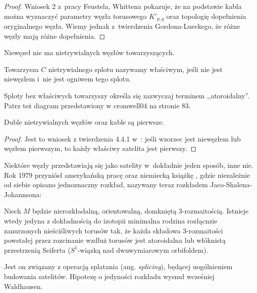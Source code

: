 \begin{proof}
    Wniosek 2 z~pracy \cite{feustel78} Feustela, Whittena pokazuje, że na podstawie kabla można wyznaczyć parametry węzła torusowego $K'_{p,q}$ oraz topologię dopełnienia oryginalnego węzła.
    Wiemy jednak z~twierdzenia Gordona-Lueckego, że różne węzły mają różne dopełnienia.
\end{proof}

Niewęzeł nie ma nietrywialnych węzłów towarzyszących.

\begin{definition}
	Towarzysza $C$ nietrywialnego splotu nazywamy właściwym, jeśli nie jest niewęzłem i~nie jest ogniwem tego splotu.
\end{definition}

Sploty bez właściwych towarzyszy określa się zazwyczaj terminem ,,atoroidalny''.
Patrz też diagram przedstawiony w {cromwell04} na stronie 83.

\begin{proposition}
	Duble nietrywialnych węzłów oraz kable są pierwsze.
\end{proposition}

\begin{proof}
	Jest to wniosek z twierdzenia 4.4.1 w~\cite{cromwell04}: jeśli wzorzec jest niewęzłem lub węzłem pierwszym, to każdy właściwy satelita jest pierwszy.
\end{proof}

Niektóre węzły przedstawiają się jako satelity w~dokładnie jeden sposób, inne nie.
Rok 1979 przyniósł amerykańską pracę \cite{jaco79} oraz niemiecką książkę \cite{johannson79}, gdzie niezależnie od siebie opisano jednoznaczny rozkład, nazywany teraz rozkładem Jaco-Shalena-Johannsona:

\begin{proposition}
	Niech $M$ będzie nierozkładalną, orientowalną, domkniętą 3-rozmaitością.
	Istnieje wtedy jedyna z dokładnością do izotopii minimalna rodzina rozłącnzie zanurzonych nieściśliwych torusów tak, że każda składowa 3-rozmaitości powstałej przez rozcinanie wzdluż torusów jest atoroidalna lub włóknistą przestrzenią Seiferta ($S^1$-wiązką nad dwuwymiarowym orbifoldem).
\end{proposition}

Jest on związany z operacją splatania (ang. \emph{splicing}), będącej uogólnieniem budowania satelitów.
Hipotezę o jedyności rozkładu wysnuł wcześniej Waldhausen.

